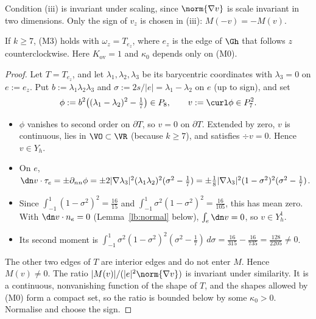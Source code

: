 Condition (iii) is invariant under scaling, since $\norm{\nabla v}$ is scale invariant in two dimensions. Only the sign of $v_z$ is chosen in (iii): $M(-v)=-M(v)$.

\begin{lemma}[(M3) for $k\ge7$]\label{lb:k7}
If $k\ge7$, (M3) holds with $\omega_z=T_{e_z}$, where $e_z$ is the edge of $\Gh$ that follows $z$ counterclockwise. Here $K_{\mathrm{ov}}=1$ and $\kappa_0$ depends only on (M0).
\end{lemma}

\begin{proof}
Let $T=T_{e_z}$, and let $\lambda_1,\lambda_2,\lambda_3$ be its barycentric coordinates with $\lambda_3=0$ on $e:=e_z$. Put $b:=\lambda_1\lambda_2\lambda_3$ and $\sigma:=2s/|e|=\lambda_1-\lambda_2$ on $e$ (up to sign), and set
\[
\phi:=b^2\bigl((\lambda_1-\lambda_2)^2-\tfrac17\bigr)\in P_8,\qquad v:=\curl\phi\in P_7^2 .
\]
\begin{itemize}
\item $\phi$ vanishes to second order on $\partial T$, so $v=0$ on $\partial T$. Extended by zero, $v$ is continuous, lies in $\VO\subset\VR$ (because $k\ge7$), and satisfies $\div v=0$. Hence $v\in Y_h$.
\item On $e$, $\dn v\cdot\tau_e=\pm\partial_{nn}\phi=\pm2|\nabla\lambda_3|^2(\lambda_1\lambda_2)^2(\sigma^2-\tfrac17)=\pm\tfrac18|\nabla\lambda_3|^2(1-\sigma^2)^2(\sigma^2-\tfrac17)$.
\item Since $\int_{-1}^1(1-\sigma^2)^2=\frac{16}{15}$ and $\int_{-1}^1\sigma^2(1-\sigma^2)^2=\frac{16}{105}$, this has mean zero. With $\dn v\cdot n_e=0$ (Lemma~\ref{lb:normal} below), $\int_e\dn v=0$, so $v\in Y_h^1$.
\item Its second moment is $\int_{-1}^1\sigma^2(1-\sigma^2)^2(\sigma^2-\frac17)\,d\sigma=\frac{16}{315}-\frac{16}{735}=\frac{128}{2205}\neq0$.
\end{itemize}
The other two edges of $T$ are interior edges and do not enter $M$. Hence $M(v)\ne0$. The ratio $|M(v)|/(|e|^2\norm{\nabla v})$ is invariant under similarity. It is a continuous, nonvanishing function of the shape of $T$, and the shapes allowed by (M0) form a compact set, so the ratio is bounded below by some $\kappa_0>0$. Normalise and choose the sign.
\end{proof}

